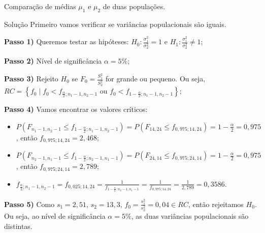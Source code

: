\documentclass[9pt]{beamer}
\begin{document}
\begin{frame}{Comparação de médias $\mu_1$ e $\mu_2$ de duas populações.}

\begin{block}{Solução}
	Primeiro vamos verificar se variâncias populacionais são iguais.
	
	\textbf{Passo 1)} Queremos testar as hipóteses: $H_0: \frac{\sigma_1^2}{\sigma_2^2} = 1$ e $H_1:\frac{\sigma_1^2}{\sigma_2^2} \neq 1$;
	
	\textbf{Passo 2)} Nível de significância $\alpha=5\%$;
	
	\textbf{Passo 3)} Rejeito $H_0$ se $F_0 = \frac{S_1^2}{S_2^2}$ for grande ou pequeno. Ou seja, $RC= \left\{ f_0 \mid f_0 < f_{\frac{\alpha}{2}; n_1-1, n_2-1} \mbox{ ou } f_0 < f_{1-\frac{\alpha}{2};n_1-1, n_2-1} \right\}$;
	
	\textbf{Passo 4)} Vamos encontrar os valores críticos:
	\begin{itemize}
		\item $P(F_{n_1-1, n_2-1} \leq f_{1-\frac{\alpha}{2}; n_1-1, n_2-1}) = P(F_{14, 24} \leq f_{0,975; 14, 24}) = 1-\frac{\alpha}{2} = 0,975$, então $f_{0,975; 14, 24} = 2,468$;
		\item $P(F_{n_2-1, n_1-1} \leq f_{1-\frac{\alpha}{2}; n_2-1, n_1-1}) = P(F_{24, 14} \leq f_{0,975; 24, 14}) = 1-\frac{\alpha}{2} = 0,975$, então $f_{0,975; 24, 14} = 2,789$;
		\item $f_{\frac{\alpha}{2};n_1-1, n_2-1} = f_{0,025; 14, 24} = \frac{1}{f_{1-\frac{\alpha}{2}; n_2-1, n_1-1}} = \frac{1}{f_{0,975; 14, 24}} = \frac{1}{2,789} =0,3586$.
	\end{itemize}

	\textbf{Passo 5)} Como $s_1=2,51$, $s_2 = 13,3$, $f_0 = \frac{s_1^2}{s_2^2} = 0,04 \in RC$, então rejeitamos $H_0$. Ou seja, ao nível de significância $\alpha=5\%$, as duas variâncias populacionais são distintas.
\end{block}
\end{frame}
\end{document}
